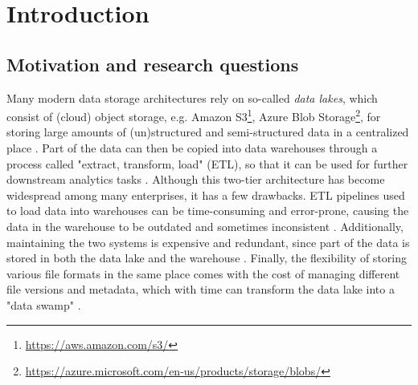 \chapter{Introduction}\label{ch:introduction}


\section{Motivation and research questions}


Many modern data storage architectures rely on so-called \textit{data lakes}, which consist of (cloud) object storage, e.g. Amazon S3\footnote{\url{https://aws.amazon.com/s3/}}, Azure Blob Storage\footnote{\url{https://azure.microsoft.com/en-us/products/storage/blobs/}}, for storing large amounts of (un)structured and semi-structured data in a centralized place \cite{WhatDataLake}. Part of the data can then be copied into data warehouses through a process called "extract, transform, load" (ETL), so that it can be used for further downstream analytics tasks \cite{michael_armbrust_lakehouse_2021}. Although this two-tier architecture has become widespread among many enterprises, it has a few drawbacks. ETL pipelines used to load data into warehouses can be time-consuming and error-prone, causing the data in the warehouse to be outdated and sometimes inconsistent \cite{schneider_lakehouse_2024}. Additionally, maintaining the two systems is expensive and redundant, since part of the data is stored in both the data lake and the warehouse \cite{michael_armbrust_lakehouse_2021}. Finally, the flexibility of storing various file formats in the same place comes with the cost of managing different file versions and metadata, which with time can transform the data lake into a "data swamp" \cite{avrilayshaDeltaLakeVs}.
 

